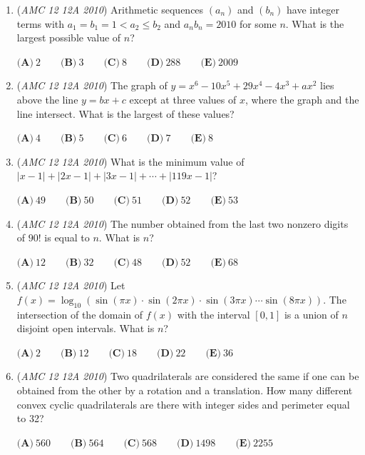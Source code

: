 \begin{enumerate}
	\item (\textit{AMC 12 12A 2010}) Arithmetic sequences $\left(a_n\right)$ and $\left(b_n\right)$ have integer terms with $a_1=b_1=1<a_2 \le b_2$ and $a_n b_n = 2010$ for some $n$. What is the largest possible value of $n$?


 $\textbf{(A)}\ 2 \qquad \textbf{(B)}\ 3 \qquad \textbf{(C)}\ 8 \qquad \textbf{(D)}\ 288 \qquad \textbf{(E)}\ 2009$


	\item (\textit{AMC 12 12A 2010}) The graph of $y=x^6-10x^5+29x^4-4x^3+ax^2$ lies above the line $y=bx+c$ except at three values of $x$, where the graph and the line intersect. What is the largest of these values?


 $\textbf{(A)}\ 4 \qquad \textbf{(B)}\ 5 \qquad \textbf{(C)}\ 6 \qquad \textbf{(D)}\ 7 \qquad \textbf{(E)}\ 8$


	\item (\textit{AMC 12 12A 2010}) What is the minimum value of $\left|x-1\right| + \left|2x-1\right| + \left|3x-1\right| + \cdots + \left|119x - 1 \right|$?


 $\textbf{(A)}\ 49 \qquad \textbf{(B)}\ 50 \qquad \textbf{(C)}\ 51 \qquad \textbf{(D)}\ 52 \qquad \textbf{(E)}\ 53$


	\item (\textit{AMC 12 12A 2010}) The number obtained from the last two nonzero digits of $90!$ is equal to $n$. What is $n$?


 $\textbf{(A)}\ 12 \qquad \textbf{(B)}\ 32 \qquad \textbf{(C)}\ 48 \qquad \textbf{(D)}\ 52 \qquad \textbf{(E)}\ 68$


	\item (\textit{AMC 12 12A 2010}) Let $f(x) = \log_{10} \left(\sin(\pi x) \cdot \sin(2 \pi x) \cdot \sin (3 \pi x) \cdots \sin(8 \pi x)\right)$. The intersection of the domain of $f(x)$ with the interval $[0,1]$ is a union of $n$ disjoint open intervals. What is $n$?


 $\textbf{(A)}\ 2 \qquad \textbf{(B)}\ 12 \qquad \textbf{(C)}\ 18 \qquad \textbf{(D)}\ 22 \qquad \textbf{(E)}\ 36$


	\item (\textit{AMC 12 12A 2010}) Two quadrilaterals are considered the same if one can be obtained from the other by a rotation and a translation. How many different convex cyclic quadrilaterals are there with integer sides and perimeter equal to 32?


 $\textbf{(A)}\ 560 \qquad \textbf{(B)}\ 564 \qquad \textbf{(C)}\ 568 \qquad \textbf{(D)}\ 1498 \qquad \textbf{(E)}\ 2255$


\end{enumerate}